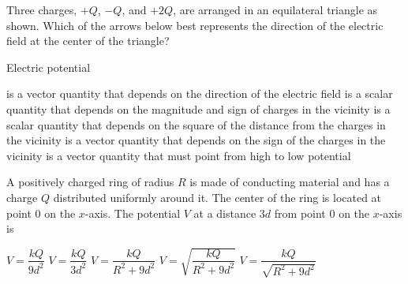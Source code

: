 \documentclass{../../oss-classkick-exam}
\begin{document}
\begin{multicols*}{2}
\begin{questions}
    \question Three charges, $+Q$, $-Q$, and $+2Q$, are arranged in an
    equilateral triangle as shown. Which of the arrows below best represents the
    direction of the electric field at the center of the triangle?
    \begin{center}
      \vspace{-.1in}
    \end{center}
    \begin{choices}
      \choice {\Huge$\downarrow$}
      \choice {\Huge$\uparrow$}
      \choice {\Huge$\searrow$}
      \choice {\Huge$\swarrow$}
      \choice {\Huge$\nearrow$}
    \end{choices}
    \columnbreak
    
    \question Electric potential
    \begin{choices}
      \choice is a vector quantity that depends on the direction of the electric
      field
      \choice is a scalar quantity that depends on the magnitude and sign of
      charges in the vicinity
      \choice is a scalar quantity that depends on the square of the distance
      from the charges in the vicinity
      \choice is a vector quantity that depends on the sign of the charges in
      the vicinity
      \choice is a vector quantity that must point from high to low potential
    \end{choices}
    \vspace{.7in}
   
    \question A positively charged ring of radius $R$ is made of conducting
    material and has a charge $Q$ distributed uniformly around it. The center of
    the ring is located at point $0$ on the $x$-axis. The potential $V$ at a
    distance $3d$ from point $0$ on the $x$-axis is
    \begin{center}
    \end{center}
    \begin{choices}
      \choice $V=\dfrac{kQ}{9d^2}$
      \choice $V=\dfrac{kQ}{3d^2}$
      \choice $V=\dfrac{kQ}{R^2+9d^2}$
      \choice $V=\sqrt{\dfrac{kQ}{R^2+9d^2}}$
      \choice $V=\dfrac{kQ}{\sqrt{R^2+9d^2}}$
    \end{choices}
    \columnbreak
  

\end{questions}
\end{multicols*}
\end{document}
